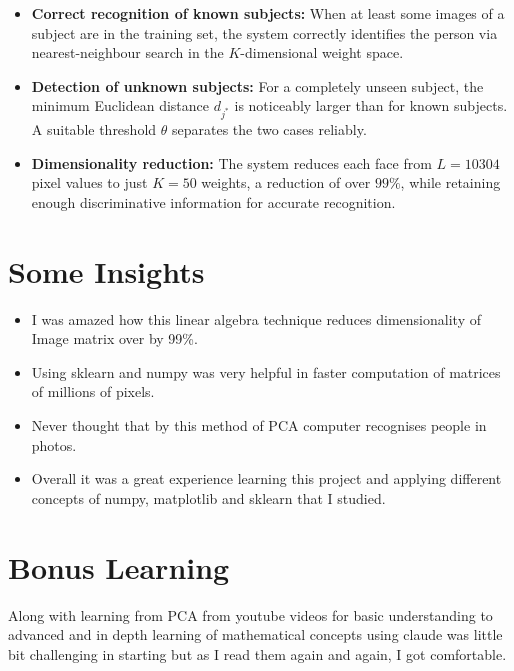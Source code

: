 \documentclass[12pt,a4paper]{article}
\begin{document}
\begin{itemize}
    \item \textbf{Correct recognition of known subjects:} When at least some
          images of a subject are in the training set, the system correctly
          identifies the person via nearest-neighbour search in the
          $K$-dimensional weight space.

    \item \textbf{Detection of unknown subjects:} For a completely unseen
          subject, the minimum Euclidean distance $d_{j^*}$ is noticeably
          larger than for known subjects. A suitable threshold $\theta$
          separates the two cases reliably.

    \item \textbf{Dimensionality reduction:} The system reduces each face
          from $L = 10304$ pixel values to just $K = 50$ weights, a
          reduction of over $99\%$, while retaining enough discriminative
          information for accurate recognition.
\end{itemize}







\section{Some Insights }

\begin{itemize}
\item I was amazed how this linear algebra technique reduces dimensionality of Image matrix over by 99\%.
\item Using sklearn and numpy was very helpful in faster computation of matrices of millions of pixels.
\item Never thought that by this method of PCA computer recognises people in photos.
\item Overall it was a great experience learning this project and applying different concepts of numpy, matplotlib and sklearn that I studied.
\end{itemize}

\section{Bonus Learning}
Along with learning from PCA from youtube videos for basic understanding to advanced and in
depth learning of mathematical concepts using claude was little bit challenging in starting but as I read them again and 
again, I got comfortable. \\
\end{document}
